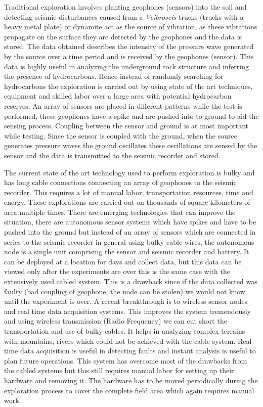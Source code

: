 \documentclass[conference]{IEEEtran}
\begin{document}
Traditional exploration involves planting geophones (sensors) into the soil and detecting seismic disturbances caused from a \emph{Veibroseis} trucks (trucks with a heavy metal plate) or dynamite act as the source of vibration, as these vibrations propagate on the surface they are detected by the geophones and the data is stored. The data obtained describes the intensity of the pressure wave generated by the source over a time period and is received by the geophones (sensor). This data is highly useful in analyzing the underground rock structure and inferring the presence of hydrocarbons. Hence instead of randomly searching for hydrocarbons the exploration is carried out by using state of the art techniques, equipment and skilled labor over a large area with potential hydrocarbon reserves. An array of sensors are placed in different patterns while the test is performed, these geophones have a spike and are pushed into to ground to aid the sensing process. Coupling between the sensor and ground is at most important while testing. Since the sensor is coupled with the ground, when the source generates pressure waves the ground oscillates these oscillations are sensed by the sensor and the data is transmitted to the seismic recorder and stored. 

The current state of the art technology used to perform exploration is bulky and has long cable connections connecting an array of geophones to the seismic recorder. This requires a lot of manual labor, transportation resources, time and energy. These explorations are carried out on thousands of square kilometers of area multiple times. There are emerging technologies that can improve the situation, there are autonomous sensor systems which have spikes and have to be pushed into the ground but instead of an array of sensors which are connected in series to the seismic recorder in general using bulky cable wires, the autonomous node is a single unit comprising the sensor and seismic recorder and battery. It can be deployed at a location for days and collect data, but this data can be viewed only after the experiments are over this is the same case with the extensively used cabled system. This is a drawback since if the data collected was faulty (bad coupling of geophone, the node can be stolen) we would not know until the experiment is over. A recent breakthrough is to wireless sensor nodes and real time data acquisition systems. This improves the system tremendously and using wireless transmission (Radio Frequency) we can cut short the transportation and use of bulky cables. It helps in analyzing complex terrains with mountains, rivers which could not be achieved with the cable system. Real time data acquisition is useful in detecting faults and instant analysis is useful to plan future operations. This system has overcome most of the drawbacks from the cabled systems but this still requires manual labor for setting up their hardware and removing it. The hardware has to be moved periodically during the exploration process to cover the complete field area which again requires manual work. 
 
\end{document}
